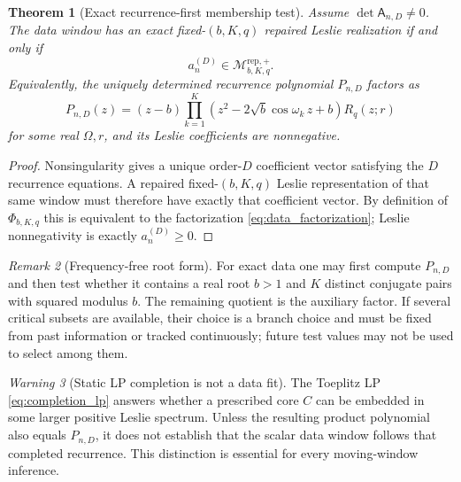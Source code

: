 \documentclass[11pt]{amsart}
\numberwithin{equation}{section}
\theoremstyle{plain}
\newtheorem{theorem}{Theorem}[section]
\theoremstyle{definition}
\theoremstyle{remark}
\newtheorem{remark}[theorem]{Remark}
\newtheorem{warning}[theorem]{Warning}
\begin{document}
\begin{theorem}[Exact recurrence-first membership test]
\label{thm:data_first_membership}
Assume $\det\mathsf A_{n,D}\neq0$. The data window has an exact fixed-$(b,K,q)$ repaired Leslie realization if and only if
\begin{equation}
a_n^{(D)}\in\mathcal M^{\mathrm{rep},+}_{b,K,q}.
\label{eq:data_first_membership}
\end{equation}
Equivalently, the uniquely determined recurrence polynomial $P_{n,D}$ factors as
\begin{equation}
P_{n,D}(z)=(z-b)\prod_{k=1}^{K}\left(z^2-2\sqrt b\cos\omega_k\,z+b\right)R_q(z;r)
\label{eq:data_factorization}
\end{equation}
for some real $\Omega,r$, and its Leslie coefficients are nonnegative.
\end{theorem}

\begin{proof}
Nonsingularity gives a unique order-$D$ coefficient vector satisfying the $D$ recurrence equations. A repaired fixed-$(b,K,q)$ Leslie representation of that same window must therefore have exactly that coefficient vector. By definition of $\Phi_{b,K,q}$ this is equivalent to the factorization \eqref{eq:data_factorization}; Leslie nonnegativity is exactly $a_n^{(D)}\geq0$.
\end{proof}

\begin{remark}[Frequency-free root form]
\label{rem:frequency_free_repaired_root_test}
For exact data one may first compute $P_{n,D}$ and then test whether it contains a real root $b>1$ and $K$ distinct conjugate pairs with squared modulus $b$. The remaining quotient is the auxiliary factor. If several critical subsets are available, their choice is a branch choice and must be fixed from past information or tracked continuously; future test values may not be used to select among them.
\end{remark}

\begin{warning}[Static LP completion is not a data fit]
\label{warn:static_completion_not_data_fit}
The Toeplitz LP \eqref{eq:completion_lp} answers whether a prescribed core $C$ can be embedded in some larger positive Leslie spectrum. Unless the resulting product polynomial also equals $P_{n,D}$, it does not establish that the scalar data window follows that completed recurrence. This distinction is essential for every moving-window inference.
\end{warning}
\end{document}
